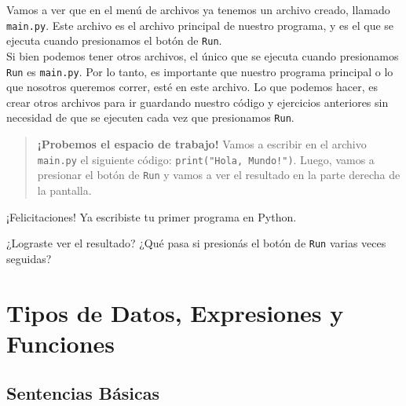 \documentclass[
  letterpaper,
  DIV=11,
  numbers=noendperiod]{scrreprt}
\begin{document}
Vamos a ver que en el menú de archivos ya tenemos un archivo creado,
llamado \texttt{main.py}. Este archivo es el archivo principal de
nuestro programa, y es el que se ejecuta cuando presionamos el botón de
\texttt{Run}.\\
Si bien podemos tener otros archivos, el único que se ejecuta cuando
presionamos \texttt{Run} es \texttt{main.py}. Por lo tanto, es
importante que nuestro programa principal o lo que nosotros queremos
correr, esté en este archivo. Lo que podemos hacer, es crear otros
archivos para ir guardando nuestro código y ejercicios anteriores sin
necesidad de que se ejecuten cada vez que presionamos \texttt{Run}.

\begin{quote}
\textbf{¡Probemos el espacio de trabajo!} Vamos a escribir en el archivo
\texttt{main.py} el siguiente código: \texttt{print("Hola,\ Mundo!")}.
Luego, vamos a presionar el botón de \texttt{Run} y vamos a ver el
resultado en la parte derecha de la pantalla.
\end{quote}

¡Felicitaciones! Ya escribiste tu primer programa en Python.

\begin{tcolorbox}[enhanced jigsaw, opacityback=0, coltitle=black, toptitle=1mm, colframe=quarto-callout-note-color-frame, leftrule=.75mm, colback=white, opacitybacktitle=0.6, toprule=.15mm, breakable, bottomrule=.15mm, rightrule=.15mm, bottomtitle=1mm, titlerule=0mm, title=\textcolor{quarto-callout-note-color}{\faInfo}\hspace{0.5em}{}, colbacktitle=quarto-callout-note-color!10!white, left=2mm, arc=.35mm]

¿Lograste ver el resultado? ¿Qué pasa si presionás el botón de
\texttt{Run} varias veces seguidas?\\

\end{tcolorbox}


\chapter{Tipos de Datos, Expresiones y
Funciones}\label{tipos-de-datos-expresiones-y-funciones}

\section{Sentencias Básicas}\label{sentencias-buxe1sicas}
\end{document}
